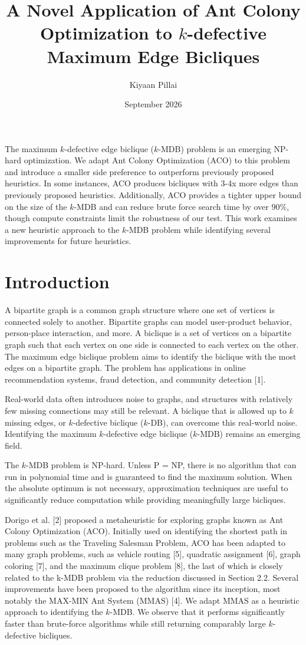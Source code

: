 \documentclass{article}
\title{A Novel Application of Ant Colony Optimization to $k$-defective Maximum Edge Bicliques}
\author{Kiyaan Pillai}
\date{September 2026}
\begin{document}
\maketitle

The maximum $k$-defective edge biclique ($k$-MDB) problem is an emerging NP-hard optimization. We adapt Ant Colony Optimization (ACO) to this problem and introduce a smaller side preference to outperform previously proposed heuristics. In some instances, ACO produces bicliques with 3-4x more edges than previously proposed heuristics. Additionally, ACO provides a tighter upper bound on the size of the $k$-MDB and can reduce brute force search time by over $90\%$, though compute constraints limit the robustness of our test. This work examines a new heuristic approach to the $k$-MDB problem while identifying several improvements for future heuristics.

\section{Introduction}

A bipartite graph is a common graph structure where one set of vertices is connected solely to another. Bipartite graphs can model user-product behavior, person-place interaction, and more. A biclique is a set of vertices on a bipartite graph such that each vertex on one side is connected to each vertex on the other.  The maximum edge biclique problem aims to identify the biclique with the most edges on a bipartite graph.  The problem has applications in online recommendation systems, fraud detection, and community detection [1].

Real-world data often introduces noise to graphs, and structures with relatively few missing connections may still be relevant. A biclique that is allowed up to $k$ missing edges, or $k$-defective biclique ($k$-DB), can overcome this real-world noise. Identifying the maximum $k$-defective edge biclique ($k$-MDB) remains an emerging field.

The $k$-MDB problem is NP-hard. Unless P = NP, there is no algorithm that can run in polynomial time and is guaranteed to find the maximum solution. When the absolute optimum is not necessary, approximation techniques are useful to significantly reduce computation while providing meaningfully large bicliques.

Dorigo et al. [2] proposed a metaheuristic for exploring graphs known as Ant Colony Optimization (ACO). Initially used on identifying the shortest path in problems such as the Traveling Salesman Problem, ACO has been adapted to many graph problems, such as vehicle routing [5], quadratic assignment [6], graph coloring [7], and the maximum clique problem [8], the last of which is closely related to the k-MDB problem via the reduction discussed in Section 2.2. Several improvements have been proposed to the algorithm since its inception, most notably the MAX-MIN Ant System (MMAS) [4]. We adapt MMAS as a heuristic approach to identifying the $k$-MDB. We observe that it performs significantly faster than brute-force algorithms while still returning comparably large $k$-defective bicliques.
\end{document}
